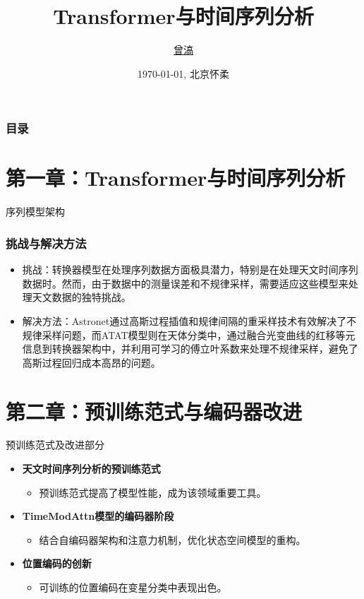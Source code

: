 \documentclass[10pt]{ctexbeamer}
\title[UCAS Beamer (\LaTeX{})]{Transformer与时间序列分析}
\author[H. Zeng]{\href{mailto:haozeng1210@gmail.com}{曾滈}}
\institute[NAOC]{中国科学院国家天文台}
\date[\today]{\today, 北京怀柔}
\begin{document}
\begin{frame}[plain]
  \maketitle
\end{frame}

\begin{frame}[t]
  \frametitle{目录}
  \tableofcontents
\end{frame}

\section{第一章：Transformer与时间序列分析}

\begin{frame}{序列模型架构}
  \frametitle{挑战与解决方法}
  \begin{itemize}
    \item 挑战：转换器模型在处理序列数据方面极具潜力，特别是在处理天文时间序列数据时。然而，由于数据中的测量误差和不规律采样，需要适应这些模型来处理天文数据的独特挑战。
    \item 解决方法：Astronet通过高斯过程插值和规律间隔的重采样技术有效解决了不规律采样问题，而ATAT模型则在天体分类中，通过融合光变曲线的红移等元信息到转换器架构中，并利用可学习的傅立叶系数来处理不规律采样，避免了高斯过程回归成本高昂的问题。
  \end{itemize}
\end{frame}


\section{第二章：预训练范式与编码器改进}

\begin{frame}{预训练范式及改进部分}
  \begin{itemize}
    \item \textbf{天文时间序列分析的预训练范式}
          \begin{itemize}
            \item 预训练范式提高了模型性能，成为该领域重要工具。
          \end{itemize}
    \item \textbf{TimeModAttn模型的编码器阶段}
          \begin{itemize}
            \item 结合自编码器架构和注意力机制，优化状态空间模型的重构。
          \end{itemize}
    \item \textbf{位置编码的创新}
          \begin{itemize}
            \item 可训练的位置编码在变星分类中表现出色。
          \end{itemize}
  \end{itemize}
\end{frame}
\end{document}
